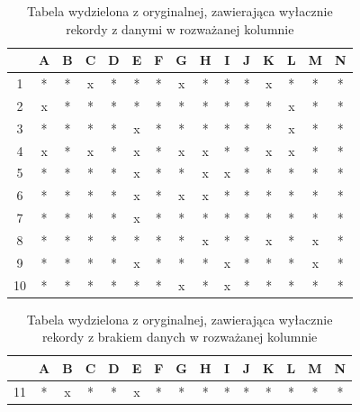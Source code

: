 \documentclass[12pt,twoside]{article}
\begin{document}
\begin{enumerate}[label=\arabic*), leftmargin=1.25cm]
        \begin{table}[ht]
        \caption{Tabela wydzielona z oryginalnej, zawierająca wyłacznie rekordy z danymi w rozważanej kolumnie}
        \centering
            \begin{tabular}{|c|c|c|c|c|c|c|c|c|c|c|c|c|c|c|}
                \hline
                   & A & B & C & D & E & F & G & H & I & J & K & L & M & N \\ \hline
                1  & * & * & x & * & * & * & x & * & * & * & x & * & * & * \\ \hline
                2  & x & * & * & * & * & * & * & * & * & * & * & x & * & * \\ \hline
                3  & * & * & * & * & x & * & * & * & * & * & * & x & * & * \\ \hline
                4  & x & * & x & * & x & * & x & x & * & * & x & x & * & * \\ \hline
                5  & * & * & * & * & x & * & * & x & x & * & * & * & * & * \\ \hline
                6  & * & * & * & * & x & * & x & x & * & * & * & * & * & * \\ \hline
                7  & * & * & * & * & x & * & * & * & * & * & * & * & * & * \\ \hline
                8  & * & * & * & * & * & * & * & x & * & * & x & * & x & * \\ \hline
                9  & * & * & * & * & x & * & * & * & x & * & * & * & x & * \\ \hline
                10 & * & * & * & * & * & * & x & * & x & * & * & * & * & * \\ \hline
            \end{tabular}
        \label{tab:simple_full}
        \end{table}
        \FloatBarrier

        \begin{table}[ht]
        \caption{Tabela wydzielona z oryginalnej, zawierająca wyłacznie rekordy z brakiem danych w rozważanej kolumnie}
        \centering
            \begin{tabular}{|c|c|c|c|c|c|c|c|c|c|c|c|c|c|c|}
                \hline
                   & A & B & C & D & E & F & G & H & I & J & K & L & M & N \\ \hline
                11 & * & x & * & * & x & * & * & * & * & * & * & * & * & * \\ \hline
            \end{tabular}
        \label{tab:simple_nan}
        \end{table}
        \FloatBarrier


\end{enumerate}
\end{document}
